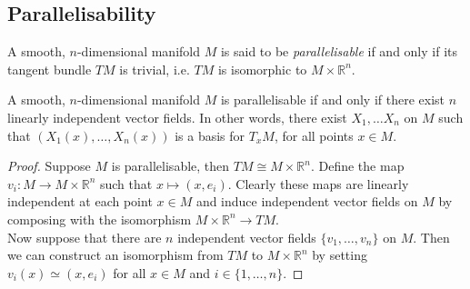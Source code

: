 \subsection{Parallelisability}
\begin{definition}
A smooth, $n$-dimensional manifold $M$ is said to be \textit{parallelisable} if and only if its tangent bundle $TM$ is trivial, i.e. $TM$ is isomorphic to $M\times\mathbb{R}^n$.
\end{definition}
\begin{proposition}
A smooth, $n$-dimensional manifold $M$ is parallelisable if and only if there exist $n$ linearly independent vector fields. In other words, there exist $X_1,\ldots X_n$ on $M$ such that $\left(X_1(x),\ldots, X_n(x) \right)$ is a basis for $T_xM$, for all points $x\in M$.
\label{prop:para-condn}
\end{proposition}
\begin{proof}
Suppose $M$ is parallelisable, then $TM\cong M\times\mathbb{R}^n$. Define the map $v_i:M\to M\times\mathbb{R}^n$ such that $x\mapsto (x,e_i)$. Clearly these maps are linearly independent at each point $x\in M$ and induce independent vector fields on $M$ by composing with the isomorphism $M\times \mathbb{R}^n\to TM$.\\

Now suppose that there are $n$ independent vector fields $\{v_1,\ldots,v_n\}$ on $M$. Then we can construct an isomorphism from $TM$ to $M\times\mathbb{R}^n$ by setting $v_i(x)\simeq (x,e_i)$ for all $x\in M$ and $i\in\{1,\ldots,n\}$.
\end{proof}
\pagebreak
